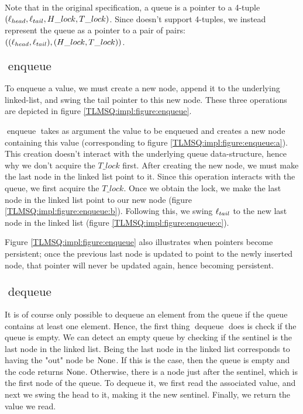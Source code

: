 \documentclass[a4paper, 11pt]{report}
\newcommand{\enqueue}{\operatorname{enqueue}}
\newcommand{\dequeue}{\operatorname{dequeue}}
\begin{document}
Note that in the original specification, a queue is a pointer to a 4-tuple $(\ell_{head}, \ell_{tail}, H\_lock, T\_lock)$. Since \heaplang doesn't support 4-tuples, we instead represent the queue as a pointer to a pair of pairs: $((\ell_{head}, \ell_{tail}), (H\_lock, T\_lock))$.


\subsection[enqueue]{$\enqueue$}

To enqueue a value, we must create a new node, append it to the underlying linked-list, and swing the tail pointer to this new node. These three operations are depicted in figure \ref{TLMSQ:impl:figure:enqueue}.

$\enqueue$ takes as argument the value to be enqueued and creates a new node containing this value (corresponding to figure \ref{TLMSQ:impl:figure:enqueue:a}). This creation doesn't interact with the underlying queue data-structure, hence why we don't acquire the $T\_lock$ first. After creating the new node, we must make the last node in the linked list point to it. Since this operation interacts with the queue, we first acquire the $T\_lock$. Once we obtain the lock, we make the last node in the linked list point to our new node (figure \ref{TLMSQ:impl:figure:enqueue:b}). Following this, we swing $\ell_{tail}$ to the new last node in the linked list (figure \ref{TLMSQ:impl:figure:enqueue:c}).

Figure \ref{TLMSQ:impl:figure:enqueue} also illustrates when pointers become persistent; once the previous last node is updated to point to the newly inserted node, that pointer will never be updated again, hence becoming persistent.

\subsection[dequeue]{$\dequeue$}

It is of course only possible to dequeue an element from the queue if the queue contains at least one element. Hence, the first thing $\dequeue$ does is check if the queue is empty. We can detect an empty queue by checking if the sentinel is the last node in the linked list. Being the last node in the linked list corresponds to having the "out" node be $\operatorname{None}$. If this is the case, then the queue is empty and the code returns $\operatorname{None}$. Otherwise, there is a node just after the sentinel, which is the first node of the queue. To dequeue it, we first read the associated value, and next we swing the head to it, making it the new sentinel. Finally, we return the value we read.
\end{document}
